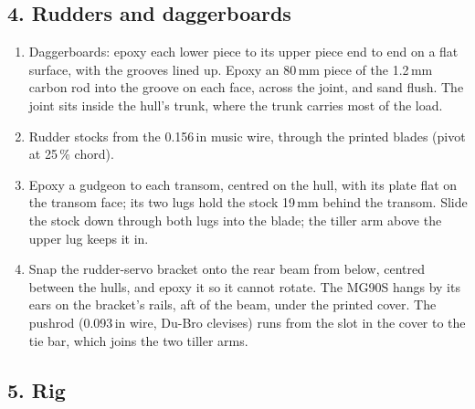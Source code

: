 \documentclass[11pt]{article}
\newcommand{\step}[1]{\subsection*{#1}}
\begin{document}
\step{4. Rudders and daggerboards}
\begin{enumerate}
\item Daggerboards: epoxy each lower piece to its upper piece end to end on a flat surface, with the grooves lined up. Epoxy an 80\,mm piece of the 1.2\,mm carbon rod into the groove on each face, across the joint, and sand flush. The joint sits inside the hull's trunk, where the trunk carries most of the load.
\item Rudder stocks from the 0.156\,in music wire, through the printed blades (pivot at 25\,\% chord).
\item Epoxy a gudgeon to each transom, centred on the hull, with its plate flat on the transom face; its two lugs hold the stock 19\,mm behind the transom. Slide the stock down through both lugs into the blade; the tiller arm above the upper lug keeps it in.
\item Snap the rudder-servo bracket onto the rear beam from below, centred between the hulls, and epoxy it so it cannot rotate. The MG90S hangs by its ears on the bracket's rails, aft of the beam, under the printed cover. The pushrod (0.093\,in wire, Du-Bro clevises) runs from the slot in the cover to the tie bar, which joins the two tiller arms.
\end{enumerate}
\step{5. Rig}
\end{document}
